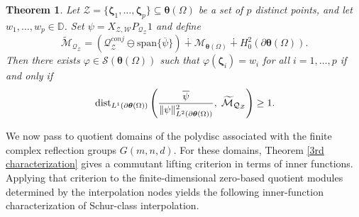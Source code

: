 \documentclass[12pt,reqno]{amsart}
\newtheorem{theorem}{Theorem}[section]
\theoremstyle{remark}
\theoremstyle{definition}
\newcommand{\dist}{{\rm\,dist}}
\begin{document}

\begin{theorem}\label{interpolation 2nd}
     Let $\mathcal{Z}=\{\boldsymbol \zeta_1,\ldots,\boldsymbol \zeta_p\}\subseteq \boldsymbol \theta(\Omega)$ be a set of $p$ distinct points, and let $w_1,\ldots,w_p\in \mathbb D$. Set $\psi=X_{\mathcal{Z,W}} P_{\mathcal{Q}_{\mathcal{Z}}}1$ and define $$\widetilde{\mathcal M}_{\mathcal{Q}_{\mathcal{Z}}}=\left(\mathcal{Q}_{\mathcal{Z}}^{conj}\ominus\mathrm{span}\{\overline{\psi}\}\right)\dotplus \mathcal{M}_{\boldsymbol \theta(\Omega)}\dotplus H^2_0(\partial\boldsymbol \theta(\Omega)).$$ Then there exists $\varphi\in \mathcal{S}(\boldsymbol \theta(\Omega))$ such that $\varphi(\boldsymbol \zeta_i)=w_i$ for all $i=1,\ldots, p$ if and only if 
     $$\dist_{L^1(\partial\boldsymbol \theta(\Omega))}\left(\frac{\overline{\psi}}{\|\psi\|^2_{L^2(\partial\boldsymbol \theta(\Omega))}}, \; \widetilde{\mathcal M}_{\mathcal{Q}_{\mathcal{Z}}}\right)\geq 1.$$
\end{theorem}

We now pass to quotient domains of the polydisc associated with the finite complex reflection groups $G(m,n,d)$. For these domains, Theorem \ref{3rd characterization} gives a commutant lifting criterion in terms of inner functions. Applying that criterion to the finite-dimensional zero-based quotient modules determined by the interpolation nodes yields the following inner-function characterization of Schur-class interpolation.
\end{document}
